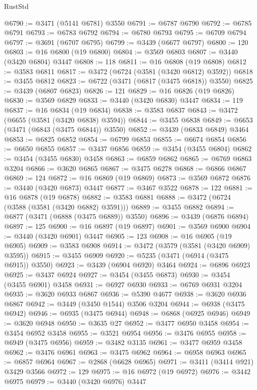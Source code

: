 \begin{lexlean}{RustStd}
\begin{coremodule}
{{{{{{{{{{{{{{{{{{{@6790 := @3471 (@5141 @6781) @3550
@6791 := @6787 @6790
@6792 := @6785 @6791
@6793 := @6783 @6792
@6794 := @6780 @6793
@6795 := @6709 @6794
@6797 := @3691 (@6707 @6795)
@6799 := @3439 (@6677 @6797)
@6800 := 120
@6803 := @16 @6800 (@19 @6800)
@6804 := @3569 @6803
@6807 := @3440 (@3420 @6804) @3447
@6808 := 118
@6811 := @16 @6808 (@19 @6808)
@6812 := @3583 @6811
@6817 := @3472 (@6724 (@3581 (@3420 @6812) @3592))
@6818 := @3455 @6812
@6823 := @6722 (@3471 (@6817 (@3475 @6818)) @3550)
@6825 := @3439 (@6807 @6823)
@6826 := 121
@6829 := @16 @6826 (@19 @6826)
@6830 := @3569 @6829
@6833 := @3440 (@3420 @6830) @3447
@6834 := 119
@6837 := @16 @6834 (@19 @6834)
@6838 := @3583 @6837
@6843 := @3472 (@6655 (@3581 (@3420 @6838) @3594))
@6844 := @3455 @6838
@6849 := @6653 (@3471 (@6843 (@3475 @6844)) @3550)
@6852 := @3439 (@6833 @6849) @3464
@6853 := @6825 @6852
@6854 := @6799 @6853
@6855 := @6674 @6854
@6856 := @6650 @6855
@6857 := @3437 @6856
@6859 := @3454 (@3455 @6804)
@6862 := @3454 (@3455 @6830) @3458
@6863 := @6859 @6862
@6865 := @6769 @6863 @3204
@6866 := @3620 @6865
@6867 := @3475 @6278
@6868 := @6866 @6867
@6869 := 124
@6872 := @16 @6869 (@19 @6869)
@6873 := @3569 @6872
@6876 := @3440 (@3420 @6873) @3447
@6877 := @3467 @3522
@6878 := 122
@6881 := @16 @6878 (@19 @6878)
@6882 := @3583 @6881
@6888 := @3472 (@6724 (@3588 (@3581 (@3420 @6882) @3591)))
@6889 := @3455 @6882
@6894 := @6877 (@3471 (@6888 (@3475 @6889)) @3550)
@6896 := @3439 (@6876 @6894)
@6897 := 125
@6900 := @16 @6897 (@19 @6897)
@6901 := @3569 @6900
@6904 := @3440 (@3420 @6901) @3447
@6905 := 123
@6908 := @16 @6905 (@19 @6905)
@6909 := @3583 @6908
@6914 := @3472 (@3579 (@3581 (@3420 @6909) @3595))
@6915 := @3455 @6909
@6920 := @5235 (@3471 (@6914 (@3475 @6915)) @3550)
@6923 := @3439 (@6904 @6920) @3464
@6924 := @6896 @6923
@6925 := @3437 @6924
@6927 := @3454 (@3455 @6873)
@6930 := @3454 (@3455 @6901) @3458
@6931 := @6927 @6930
@6933 := @6769 @6931 @3204
@6935 := @3620 @6933 @6867
@6936 := @5390 @4677
@6938 := @3620 @6936 @6867
@6942 := @3449 (@3450 @1544) @3506 @3204
@6944 := @6938 (@3475 @6942)
@6946 := @6935 (@3475 @6944)
@6948 := @6868 (@6925 @6946)
@6949 := @3620 @6948
@6950 := @3635 @27
@6952 := @3477 @6950 @3458
@6954 := @3454 @6952 @3458
@6955 := @3521 @6954
@6956 := @3476 @6955
@6958 := @6949 (@3475 @6956)
@6959 := @3482 @3135
@6961 := @3477 @6959 @3458
@6962 := @3476 @6961
@6963 := @3475 @6962
@6964 := @6958 @6963
@6965 := @6857 @6964
@6967 := @2868 (@6628 @6965)
@6971 := @3411 (@3414 @921) @3429 @3566
@6972 := 129
@6975 := @16 @6972 (@19 @6972)
@6976 := @3442 @6975
@6979 := @3440 (@3420 @6976) @3447
}}}}}}}}}}}}}}}}}}}
\end{coremodule}
\end{lexlean}
